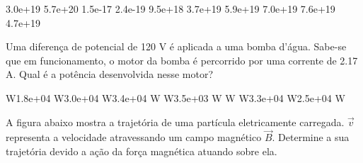 \documentclass[12pt, addpoints]{exam}
\begin{document}
\begin{questions}
\begin{multicols*}{2}
\begin{oneparchoices}
\choice 3.0e+19 \choice 5.7e+20 \choice 1.5e-17 \choice 2.4e-19 \choice 9.5e+18 \choice 3.7e+19 \choice 5.9e+19 \choice 7.0e+19 \choice 7.6e+19 \choice 4.7e+19 
\end{oneparchoices}\question Uma diferença de potencial de 120 V é aplicada a uma bomba d’água. Sabe-se que em funcionamento, o motor da bomba é percorrido por uma corrente de    2.17 A. Qual é a potência desenvolvida nesse motor?

\begin{oneparchoices}
 W\choice 1.8e+04 W\choice 3.0e+04 W\choice 3.4e+04 W W\choice 3.5e+03 W W W\choice 3.3e+04 W\choice 2.5e+04 W
\end{oneparchoices}\question A ﬁgura abaixo mostra a trajetória de uma partícula eletricamente carregada. $\vec{{v}}$ representa a velocidade atravessando um campo magnético $\vec{{B}}$. Determine a sua trajetória devido a ação da força magnética atuando sobre ela.
        
        \begin{center}
            \begin{minipage}[c]{0.5\linewidth}
            \end{minipage}
        \end{center}

        


\end{multicols*}
\end{questions}
\end{document}
